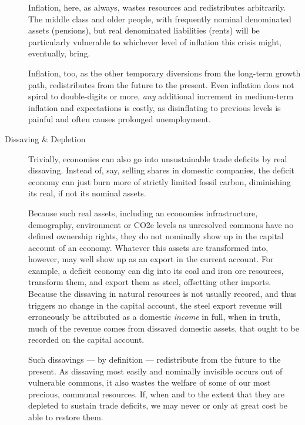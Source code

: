 \documentclass[11pt,a4paper,oneside,openright]{article}
\begin{document}
\begin{description}
	Inflation, here, as always, wastes resources and redistributes arbitrarily. 
	The middle class and older people, with frequently nominal denominated assets (pensions), but real denominated liabilities (rents) will be particularly vulnerable to whichever level of inflation this crisis might, eventually, bring.
	
	Inflation, too, as the other temporary diversions from the long-term growth path, redistributes from the future to the present. 
	Even inflation does not spiral to double-digits or more, \emph{any} additional increment in medium-term inflation and expectations is costly, as disinflating to previous levels is painful and often causes prolonged unemployment. %
	
	\item[Dissaving \& Depletion] Trivially, economies can also go into unsustainable  trade deficits by real dissaving. 
	Instead of, say, selling shares in domestic companies, the deficit economy can just burn more of strictly limited fossil carbon, diminishing its real, if not its nominal assets.
	
	Because such real assets, including an economies infrastructure, demography, environment or CO2e levels as unresolved commons have no defined ownership rights, they do not nominally show up in the capital account of an economy. 
	Whatever this assets are transformed into, however, may well show up as an export in the current account. 
	For example, a deficit economy can dig into its coal and iron ore resources, transform them, and export them as steel, offsetting other imports. 
	Because the dissaving in natural resources is not usually recored, and thus triggers no change in the capital account, the steel export revenue will erroneously be attributed as a domestic \emph{income} in full, when in truth, much of the revenue comes from dissaved domestic assets, that ought to be recorded on the capital account.
	
	Such dissavings --- by definition --- redistribute from the future to the present. 
	As dissaving most easily and nominally invisible occurs out of vulnerable commons, it also wastes the welfare of some of our most precious, communal resources. 
	If, when and to the extent that they are depleted to sustain trade deficits, we may never or only at great cost be able to restore them.
\end{description}%
\end{document}
